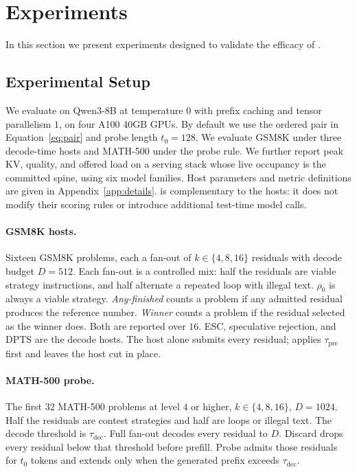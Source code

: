 \section{Experiments}
\label{sec:eval}

In this section we present experiments designed to validate the efficacy of \sys.

\subsection{Experimental Setup}
\label{sec:setup}

We evaluate on Qwen3-8B at temperature $0$ with prefix caching and tensor parallelism $1$, on four A100 40GB GPUs.
By default we use the ordered pair in Equation~\ref{eq:pair} and probe length $t_0{=}128$.
We evaluate GSM8K under three decode-time hosts and MATH-500 under the probe rule.
We further report peak KV, quality, and offered load on a serving stack whose live occupancy is the committed spine, using six model families.
Host parameters and metric definitions are given in Appendix~\ref{app:details}.
\sys is complementary to the hosts: it does not modify their scoring rules or introduce additional test-time model calls.

\paragraph{GSM8K hosts.}
Sixteen GSM8K problems, each a fan-out of $k\in\{4,8,16\}$ residuals with decode budget $D{=}512$.
Each fan-out is a controlled mix: half the residuals are viable strategy instructions, and half alternate a repeated loop with illegal text.
$\rho_0$ is always a viable strategy.
\emph{Any-finished} counts a problem if any admitted residual produces the reference number.
\emph{Winner} counts a problem if the residual selected as the winner does.
Both are reported over $16$.
ESC, speculative rejection, and DPTS are the decode hosts.
The host alone submits every residual; \sys applies $\tau_{\mathrm{pre}}$ first and leaves the host cut in place.

\paragraph{MATH-500 probe.}
The first $32$ MATH-500 problems at level $4$ or higher, $k\in\{4,8,16\}$, $D{=}1024$.
Half the residuals are contest strategies and half are loops or illegal text.
The decode threshold is $\tau_{\mathrm{dec}}$.
Full fan-out decodes every residual to $D$.
Discard drops every residual below that threshold before prefill.
Probe admits those residuals for $t_0$ tokens and extends only when the generated prefix exceeds $\tau_{\mathrm{dec}}$.

